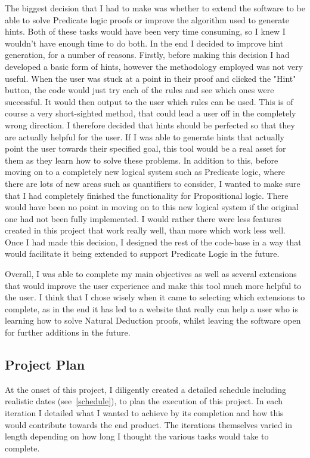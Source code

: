 The biggest decision that I had to make was whether to extend the software to be able to solve Predicate logic proofs or improve the algorithm used to generate hints. Both of these tasks would have been very time consuming, so I knew I wouldn't have enough time to do both. In the end I decided to improve hint generation, for a number of reasons. Firstly, before making this decision I had developed a basic form of hints, however the methodology employed was not very useful. When the user was stuck at a point in their proof and clicked the "Hint" button,  the code would just try each of the rules and see which ones were successful. It would then output to the user which rules can be used. This is of course a very short-sighted method, that could lead a user off in the completely wrong direction. I therefore decided that hints should be perfected so that they are actually helpful for the user. If I was able to generate hints that actually point the user towards their specified goal, this tool would be a real asset for them as they learn how to solve these problems. In addition to this, before moving on to a completely new logical system such as Predicate logic, where there are lots of new areas such as quantifiers to consider, I wanted to make sure that I had completely finished the functionality for Propositional logic. There would have been no point in moving on to this new logical system if the original one had not been fully implemented. I would rather there were less features created in this project that work really well, than more which work less well. Once I had made this decision, I designed the rest of the code-base in a way that would facilitate it being extended to support Predicate Logic in the future. 

Overall, I was able to complete my main objectives as well as several extensions that would improve the user experience and make this tool much more helpful to the user. I think that I chose wisely when it came to selecting which extensions to complete, as in the end it has led to a website that really can help a user who is learning how to solve Natural Deduction proofs, whilst leaving the software open for further additions in the future.

\subsection{Project Plan}

At the onset of this project, I diligently created a detailed schedule including realistic dates (see~\ref{schedule}), to plan the execution of this project. In each iteration I detailed what I wanted to achieve by its completion and how this would contribute towards the end product. The iterations themselves varied in length depending on how long I thought the various tasks would take to complete.


